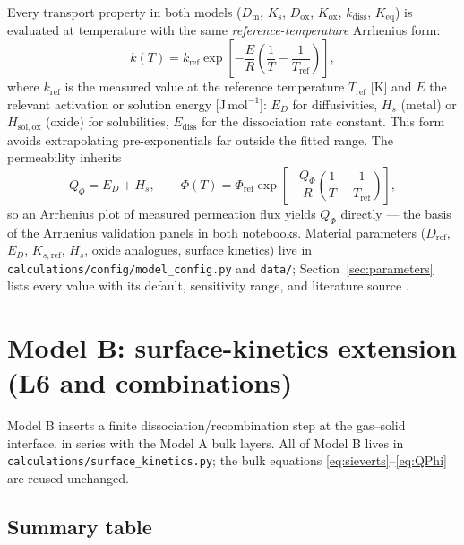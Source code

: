 \documentclass[11pt,a4paper]{article}
\newcommand{\Ks}{K_{\mathrm{s}}}
\newcommand{\Kox}{K_{\mathrm{ox}}}
\newcommand{\Keq}{K_{\mathrm{eq}}}
\newcommand{\Dm}{D_{\mathrm{m}}}
\newcommand{\Dox}{D_{\mathrm{ox}}}
\newcommand{\kdiss}{k_{\mathrm{diss}}}
\newcommand{\code}[1]{\texttt{#1}}
\begin{document}
Every transport property in both models ($\Dm$, $\Ks$, $\Dox$, $\Kox$,
$\kdiss$, $\Keq$) is evaluated at temperature with the same
\emph{reference-temperature} Arrhenius form:
\begin{equation}
  k(T) = k_{\mathrm{ref}} \exp\!\left[-\frac{E}{R}\left(\frac{1}{T} - \frac{1}{T_{\mathrm{ref}}}\right)\right],
  \label{eq:arrhenius}
\end{equation}
where $k_{\mathrm{ref}}$ is the measured value at the reference temperature
$T_{\mathrm{ref}}$ [K] and $E$ the relevant activation or solution energy
[$\mathrm{J\,mol^{-1}}$]: $E_D$ for diffusivities, $H_s$ (metal) or
$H_{\mathrm{sol,ox}}$ (oxide) for solubilities, $E_{\mathrm{diss}}$ for the
dissociation rate constant. This form avoids extrapolating pre-exponentials
far outside the fitted range. The permeability inherits
\begin{equation}
  Q_\Phi = E_D + H_s,
  \qquad \Phi(T) = \Phi_{\mathrm{ref}}
  \exp\!\left[-\frac{Q_\Phi}{R}\left(\frac1T - \frac1{T_{\mathrm{ref}}}\right)\right],
  \label{eq:QPhi}
\end{equation}
so an Arrhenius plot of measured permeation flux yields $Q_\Phi$ directly ---
the basis of the Arrhenius validation panels in both notebooks. Material
parameters ($D_{\mathrm{ref}}$, $E_D$, $K_{s,\mathrm{ref}}$, $H_s$, oxide
analogues, surface kinetics) live in \code{calculations/config/model\_config.py}
and \code{data/}; Section~\ref{sec:parameters} lists every value with its
default, sensitivity range, and literature source
\citep{schmidt1985,nemanic2023,stover1986,chen2011,grant1988,zhu2021,lu2022,young1997}.

\section{Model B: surface-kinetics extension (L6 and combinations)}
\label{sec:modelB}

Model B inserts a finite dissociation/recombination step at the gas--solid
interface, in series with the Model A bulk layers. All of Model B lives in
\code{calculations/surface\_kinetics.py}; the bulk equations
\eqref{eq:sieverts}--\eqref{eq:QPhi} are reused unchanged.

\subsection{Summary table}
\end{document}
